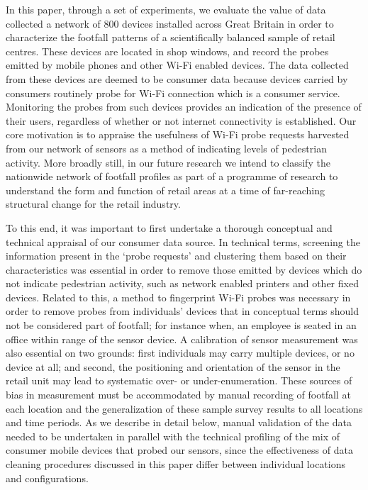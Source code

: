 In this paper, through a set of experiments, we evaluate the value of data
collected a network of 800 devices \citep{sss2016} installed across Great
Britain in order to characterize the footfall patterns of a scientifically
balanced sample of retail centres. These devices are located in shop windows,
and record the probes emitted by mobile phones and other Wi-Fi enabled devices.
The data collected from these devices are deemed to be consumer data because
devices carried by consumers routinely probe for Wi-Fi connection which is a
consumer service. Monitoring the probes from such devices provides an
indication of the presence of their users, regardless of whether or not
internet connectivity is established. Our core motivation is to appraise the
usefulness of Wi-Fi probe requests harvested from our network of sensors as a
method of indicating levels of pedestrian activity. More broadly still, in our
future research we intend to classify the nationwide network of footfall
profiles as part of a programme of research to understand the form and function
of retail areas at a time of far-reaching structural change for the retail
industry.

To this end, it was important to first undertake a thorough conceptual and
technical appraisal of our consumer data source. In technical terms, screening
the information present in the `probe requests' and clustering them based on
their characteristics was essential in order to remove those emitted by devices
which do not indicate pedestrian activity, such as network enabled printers and
other fixed devices. Related to this, a method to fingerprint Wi-Fi probes was
necessary in order to remove probes from individuals’ devices that in
conceptual terms should not be considered part of footfall; for instance when,
an employee is seated in an office within range of the sensor device. A
calibration of sensor measurement was also essential on two grounds: first
individuals may carry multiple devices, or no device at all; and second, the
positioning and orientation of the sensor in the retail unit may lead to
systematic over- or under-enumeration. These sources of bias in measurement
must be accommodated by manual recording of footfall at each location and the
generalization of these sample survey results to all locations and time
periods. As we describe in detail below, manual validation of the data needed
to be undertaken in parallel with the technical profiling of the mix of
consumer mobile devices that probed our sensors, since the effectiveness of
data cleaning procedures discussed in this paper differ between individual
locations and configurations.
